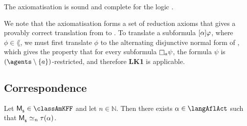 \begin{theorem}\label{afl-kff-axioms-completeness}
The axiomatisation \axiomAflKFF{} is sound and complete for the logic \logicAflKFF{}.
\end{theorem}

We note that the axiomatisation \axiomAflKFF{} forms a set of reduction axioms that gives a provably correct translation from \langAfl{} to \lang{}.
To translate a subformula ${[ {\alpha} ]} \varphi$, where $\phi \in \lang$, we must first translate $\phi$ to the alternating disjunctive normal form of \cite{hales:2012}, which gives the property that for every subformula $\necessaryA \psi$, the formula $\psi$ is $(\agents \setminus \{\agentA\})$-restricted, and therefore {\bf LK1} is applicable.

\subsection{Correspondence}

\begin{theorem}\label{afl-kff-correspondence}
Let $\aPModel{\aStateS} \in \classAmKFF$ and let $n \in \mathbb{N}$. 
Then there exists $\alpha \in \langAflAct$ such that $\aPModel{\aStateS} \bisimilar[n] \tau(\alpha)$.
\end{theorem}

